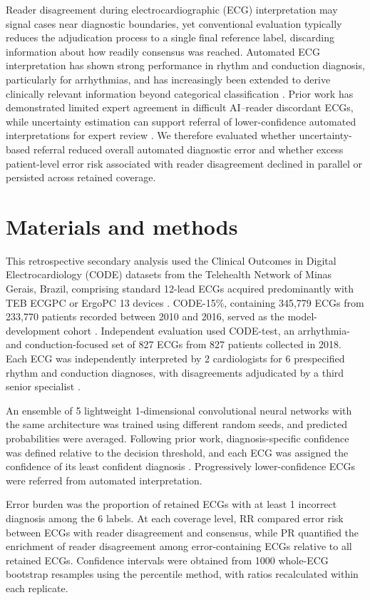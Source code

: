 \documentclass[5p,times,twocolumn]{elsarticle}
\begin{document}
Reader disagreement during electrocardiographic (ECG) interpretation may signal
cases near diagnostic boundaries, yet conventional evaluation typically reduces
the adjudication process to a single final reference label, discarding
information about how readily consensus was reached. Automated ECG
interpretation has shown strong performance in rhythm and conduction diagnosis,
particularly for arrhythmias, and has increasingly been extended to derive
clinically relevant information beyond categorical classification \cite{ribeiro2020,wei2022}.
Prior work has demonstrated limited expert agreement in difficult AI--reader
discordant ECGs, while uncertainty estimation can support referral of
lower-confidence automated interpretations for expert review \cite{vranken2021,mayourian2025}.
We therefore evaluated whether uncertainty-based referral reduced overall
automated diagnostic error and whether excess patient-level error risk associated
with reader disagreement declined in parallel or persisted across retained
coverage.

\section{Materials and methods}

This retrospective secondary analysis used the Clinical Outcomes in Digital
Electrocardiology (CODE) datasets from the Telehealth Network of Minas Gerais,
Brazil, comprising standard 12-lead ECGs acquired predominantly with TEB ECGPC
or ErgoPC 13 devices \cite{ribeiro2020}. CODE-15\%, containing 345,779 ECGs
from 233,770 patients recorded between 2010 and 2016, served as the
model-development cohort \cite{code15}. Independent evaluation used CODE-test,
an arrhythmia- and conduction-focused set of 827 ECGs from 827 patients
collected in 2018. Each ECG was independently interpreted by 2 cardiologists
for 6 prespecified rhythm and conduction diagnoses, with disagreements
adjudicated by a third senior specialist \cite{ribeiro2020}.

An ensemble of 5 lightweight 1-dimensional convolutional neural networks with
the same architecture was trained using different random seeds, and predicted
probabilities were averaged. Following prior work, diagnosis-specific confidence
was defined relative to the decision threshold, and each ECG was assigned the
confidence of its least confident diagnosis \cite{vranken2021}. Progressively
lower-confidence ECGs were referred from automated interpretation.

Error burden was the proportion of retained ECGs with at least 1 incorrect
diagnosis among the 6 labels. At each coverage level, RR compared error risk
between ECGs with reader disagreement and consensus, while PR quantified the
enrichment of reader disagreement among error-containing ECGs relative to all
retained ECGs. Confidence intervals were obtained from 1000 whole-ECG bootstrap
resamples using the percentile method, with ratios recalculated within each
replicate.
\end{document}

